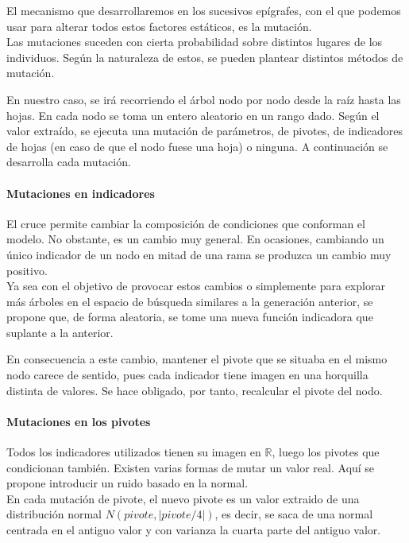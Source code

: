  El mecanismo que desarrollaremos en los sucesivos ep\'igrafes, con el que podemos usar para alterar todos estos factores est\'aticos, es la mutaci\'on.\\
 
 Las mutaciones suceden con cierta probabilidad sobre distintos lugares de los individuos. Seg\'un la naturaleza de estos, se pueden plantear distintos m\'etodos de mutaci\'on. 
 
 En nuestro caso, se ir\'a recorriendo el \'arbol nodo por nodo desde la ra\'iz hasta las hojas. En cada nodo se toma un entero aleatorio en un rango dado. Seg\'un el valor extra\'ido, se ejecuta una mutaci\'on de par\'ametros, de pivotes, de indicadores de hojas (en caso de que el nodo fuese una hoja) o ninguna. A continuaci\'on se desarrolla cada mutaci\'on.

\paragraph{Mutaciones en indicadores}
El cruce permite cambiar la composici\'on de condiciones que conforman el modelo. No obstante, es un cambio muy general. En ocasiones, cambiando un \'unico indicador de un nodo en mitad de una rama se produzca un cambio muy positivo.\\

Ya sea con el objetivo de provocar estos cambios o simplemente para explorar m\'as \'arboles en el espacio de b\'usqueda similares a la generaci\'on anterior, se propone que, de forma aleatoria, se tome una nueva funci\'on indicadora que suplante a la anterior. 

En consecuencia a este cambio, mantener el pivote que se situaba en el mismo nodo carece de sentido, pues cada indicador tiene imagen en una horquilla distinta de valores. Se hace obligado, por tanto, recalcular el pivote del nodo.  

\paragraph{Mutaciones en los pivotes}

Todos los indicadores utilizados tienen su imagen en $\mathbb{R}$, luego los pivotes que condicionan tambi\'en. Existen varias formas de mutar un valor real. Aqu\'i se propone introducir un ruido basado en la normal.\\

En cada mutaci\'on de pivote, el nuevo pivote es un valor extraido de una distribuci\'on normal $N(pivote, |pivote/4|)$, es decir, se saca de una normal centrada en el antiguo valor y con varianza la cuarta parte del antiguo valor.

